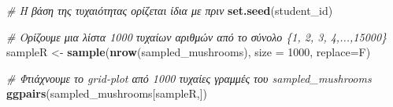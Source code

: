\documentclass[
]{article}
\newenvironment{Shaded}{\begin{snugshade}}{\end{snugshade}}
\newcommand{\AttributeTok}[1]{\textcolor[rgb]{0.13,0.29,0.53}{#1}}
\newcommand{\CommentTok}[1]{\textcolor[rgb]{0.56,0.35,0.01}{\textit{#1}}}
\newcommand{\DecValTok}[1]{\textcolor[rgb]{0.00,0.00,0.81}{#1}}
\newcommand{\FunctionTok}[1]{\textcolor[rgb]{0.13,0.29,0.53}{\textbf{#1}}}
\newcommand{\NormalTok}[1]{#1}
\newcommand{\OtherTok}[1]{\textcolor[rgb]{0.56,0.35,0.01}{#1}}
\begin{document}
\begin{Shaded}
\begin{Highlighting}[]
\CommentTok{\# Η βάση της τυχαιότητας ορίζεται ίδια με πριν}
\FunctionTok{set.seed}\NormalTok{(student\_id)}

\CommentTok{\# Ορίζουμε μια λίστα 1000 τυχαίων αριθμών από το σύνολο \{1, 2, 3, 4,...,15000\}}
\NormalTok{sampleR }\OtherTok{\textless{}{-}} \FunctionTok{sample}\NormalTok{(}\FunctionTok{nrow}\NormalTok{(sampled\_mushrooms), }\AttributeTok{size =} \DecValTok{1000}\NormalTok{, }\AttributeTok{replace=}\NormalTok{F)}

\CommentTok{\# Φτιάχνουμε το grid{-}plot από 1000 τυχαίες γραμμές του sampled\_mushrooms}
\FunctionTok{ggpairs}\NormalTok{(sampled\_mushrooms[sampleR,])}
\end{Highlighting}
\end{Shaded}
\end{document}
